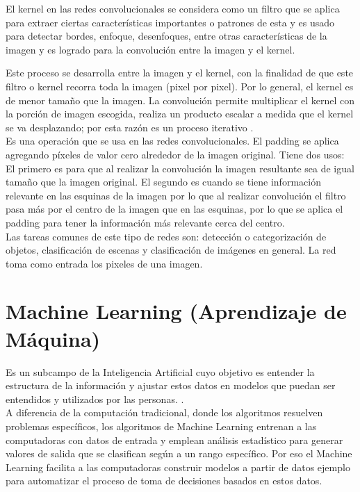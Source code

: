 El kernel en las redes convolucionales se considera como un filtro que se aplica para extraer ciertas características importantes o patrones de esta y es usado para detectar bordes, enfoque, desenfoques, entre otras características de la imagen y es logrado para la convolución entre la imagen y el kernel.

Este proceso se desarrolla entre la imagen y el kernel, con la finalidad de que este filtro o kernel recorra toda la imagen (pixel por pixel). Por lo general, el kernel es de menor tamaño que la imagen. La convolución permite multiplicar el kernel con la porción de imagen escogida, realiza un producto escalar a medida que el kernel se va desplazando; por esta razón es un proceso iterativo .\\

Es una operación que se usa en las redes convolucionales. El padding se aplica agregando píxeles de valor cero alrededor de la imagen original.
Tiene dos usos:
El primero es para que al realizar la convolución la imagen resultante sea de igual tamaño que la imagen original.
El segundo es cuando se tiene información relevante en las esquinas de la imagen por lo que al realizar convolución el filtro pasa más por el centro de la imagen que en las esquinas, por lo que se aplica el padding para tener la información más relevante cerca del centro.\\

Las tareas comunes de este tipo de redes son: detección o categorización de objetos, clasificación de escenas y clasificación de imágenes en general. La red toma como entrada los pixeles de una imagen. 

\section{Machine Learning (Aprendizaje de Máquina)}
Es un subcampo de la Inteligencia Artificial cuyo objetivo es entender la estructura de la información y ajustar estos datos en modelos que puedan ser entendidos y utilizados por las personas. \cite{digitalocean:machinelearning}.\\

A diferencia de la computación tradicional, donde los algoritmos resuelven problemas específicos, los algoritmos de Machine Learning entrenan a las computadoras con datos de entrada y emplean análisis estadístico para generar valores de salida que se clasifican según a un rango específico. Por eso el Machine Learning facilita a las computadoras construir modelos a partir de datos ejemplo para automatizar el proceso de toma de decisiones basados en estos datos.\\

